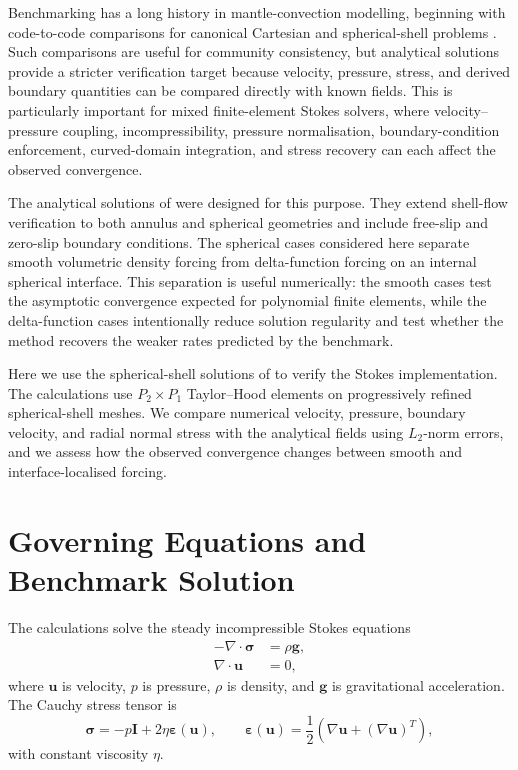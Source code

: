 \documentclass[gmd, manuscript]{copernicus}
\begin{document}
Benchmarking has a long history in mantle-convection modelling, beginning
with code-to-code comparisons for canonical Cartesian and spherical-shell
problems \citep[e.g.][]{blankenbach1989,busse1994,zhong2008,tosi2015}. Such
comparisons are useful for community consistency, but analytical solutions
provide a stricter verification target because velocity, pressure, stress, and
derived boundary quantities can be compared directly with known fields. This
is particularly important for mixed finite-element Stokes solvers, where
velocity--pressure coupling, incompressibility, pressure normalisation,
boundary-condition enforcement, curved-domain integration, and stress recovery
can each affect the observed convergence.

The analytical solutions of  were designed for this
purpose. They extend shell-flow verification to both annulus and spherical
geometries and include free-slip and zero-slip boundary conditions. The
spherical cases considered here separate smooth volumetric density forcing
from delta-function forcing on an internal spherical interface. This separation
is useful numerically: the smooth cases test the asymptotic convergence
expected for polynomial finite elements, while the delta-function cases
intentionally reduce solution regularity and test whether the method recovers
the weaker rates predicted by the benchmark.

Here we use the spherical-shell solutions of  to verify
the  Stokes implementation. The calculations use
\(P_2\times P_1\) Taylor--Hood elements on progressively refined
spherical-shell meshes. We compare numerical velocity, pressure, boundary
velocity, and radial normal stress with the analytical fields using
\(L_2\)-norm errors, and we assess how the observed convergence changes
between smooth and interface-localised forcing.

\section{Governing Equations and Benchmark Solution}

The calculations solve the steady incompressible Stokes equations
\begin{subequations}
\begin{align}
  -\nabla \cdot \boldsymbol{\sigma} &= \rho \mathbf{g}, \\
  \nabla \cdot \mathbf{u} &= 0,
\end{align}
\end{subequations}
where \(\mathbf{u}\) is velocity, \(p\) is pressure, \(\rho\) is density, and
\(\mathbf{g}\) is gravitational acceleration. The Cauchy stress tensor is
\begin{equation}
  \boldsymbol{\sigma}
  =
  -p\mathbf{I}
  +
  2\eta\boldsymbol{\varepsilon}(\mathbf{u}),
  \qquad
  \boldsymbol{\varepsilon}(\mathbf{u})
  =
  \frac{1}{2}\left(\nabla \mathbf{u}+(\nabla \mathbf{u})^T\right),
\end{equation}
with constant viscosity \(\eta\).
\end{document}

